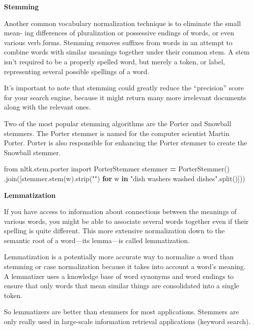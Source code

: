 \documentclass[
]{book}
\newenvironment{Shaded}{\begin{snugshade}}{\end{snugshade}}
\newcommand{\CommentTok}[1]{\textcolor[rgb]{0.56,0.35,0.01}{\textit{#1}}}
\newcommand{\ControlFlowTok}[1]{\textcolor[rgb]{0.13,0.29,0.53}{\textbf{#1}}}
\newcommand{\ImportTok}[1]{#1}
\newcommand{\KeywordTok}[1]{\textcolor[rgb]{0.13,0.29,0.53}{\textbf{#1}}}
\newcommand{\NormalTok}[1]{#1}
\newcommand{\OperatorTok}[1]{\textcolor[rgb]{0.81,0.36,0.00}{\textbf{#1}}}
\newcommand{\StringTok}[1]{\textcolor[rgb]{0.31,0.60,0.02}{#1}}
\begin{document}
\textbf{Stemming}

Another common vocabulary normalization technique is to eliminate the small mean- ing differences of pluralization or possessive endings of words, or even various verb forms. Stemming removes suffixes from words in an attempt to combine words with similar meanings together under their common stem. A stem isn't required to be a properly spelled word, but merely a token, or label, representing several possible spellings of a word.

It's important to note that stemming could greatly reduce the ``precision'' score for your search engine,
because it might return many more irrelevant documents along with the relevant ones.

Two of the most popular stemming algorithms are the Porter and Snowball stemmers. The Porter stemmer is named for the computer scientist Martin Porter. Porter is also responsible for enhancing the Porter stemmer to create the Snowball stemmer.

\begin{Shaded}
\begin{Highlighting}[]
\ImportTok{from}\NormalTok{ nltk.stem.porter}
\ImportTok{import}\NormalTok{ PorterStemmer}
\NormalTok{stemmer }\OperatorTok{=}\NormalTok{ PorterStemmer()}
\CommentTok{\textquotesingle{} \textquotesingle{}}\NormalTok{.join([stemmer.stem(w).strip(}\StringTok{"\textquotesingle{}"}\NormalTok{) }\ControlFlowTok{for}\NormalTok{ w }\KeywordTok{in} \StringTok{"dish washer\textquotesingle{}s washed dishes"}\NormalTok{.split()]))}
\end{Highlighting}
\end{Shaded}

\textbf{Lemmatization}

If you have access to information about connections between the meanings of various words, you might be able to associate several words together even if their spelling is quite different. This more extensive normalization down to the semantic root of a word---its lemma---is called lemmatization.

Lemmatization is a potentially more accurate way to normalize a word than stemming or case normalization because it takes into account a word's meaning. A lemmatizer uses a knowledge base of word synonyms and word endings to ensure that only words that mean similar things are consolidated into a single token.

So lemmatizers are better than stemmers for most applications. Stemmers are only really used in large-scale information retrieval applications (keyword search).
\end{document}
